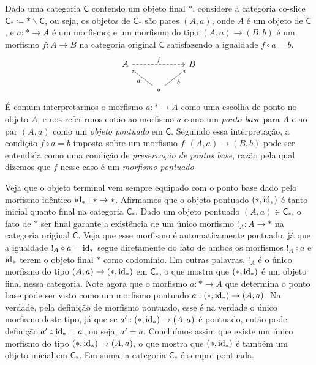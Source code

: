 \begin{exem}
  \label{exem:categoria_objetos_pontuados}
  Dada uma categoria $\mathsf{C}$ contendo um objeto final $*$, considere a categoria co-slice $\mathsf{C}_{*} \coloneqq * \backslash \mathsf{C}$, ou seja, os objetos de $\mathsf{C}_{*}$ são pares $(A,a)$, onde $A$ é um objeto de $\mathsf{C}$, e $a: * \to A$ é um morfismo; e um morfismo do tipo $(A,a) \to (B,b)$ é um morfismo $f: A \to B$ na categoria original $\mathsf{C}$ satisfazendo a igualdade $f \circ a = b$.
  \begin{displaymath}
    \begin{tikzcd}
      A
      \arrow[rr, dashed, "f"]
      & & B
      \\ & *
      \arrow[lu, "a"]
      \arrow[ru, "b" swap]
    \end{tikzcd}
  \end{displaymath}
  É comum interpretarmos o morfismo $a: * \to A$ como uma escolha de ponto no objeto $A$, e nos referirmos então ao morfismo $a$ como um \emph{ponto base} para $A$ e ao par $(A,a)$ como um \emph{objeto pontuado} em $\mathsf{C}$.
  Seguindo essa interpretação, a condição $f \circ a = b$ imposta sobre um morfismo $f: (A,a) \to (B,b)$ pode ser entendida como uma condição de \emph{preservação de pontos base}, razão pela qual dizemos que $f$ nesse caso é um \emph{morfismo pontuado}

  Veja que o objeto terminal vem sempre equipado com o ponto base dado pelo morfismo idêntico $\mathrm{id}_{*}: * \to *$.
  Afirmamos que o objeto pontuado $(*,\mathrm{id}_{*})$ é tanto inicial quanto final na categoria $\mathsf{C}_{*}$.
  Dado um objeto pontuado $(A,a) \in \mathsf{C}_{*}$, o fato de $*$ ser final garante a existência de um único morfismo $!_{A}: A \to *$ na categoria original $\mathsf{C}$.
  Veja que esse morfismo é automaticamente pontuado, já que a igualdade $!_{A} \circ a = \mathrm{id}_{*}$ segue diretamente do fato de ambos os morfismos $!_{A} \circ a$ e $\mathrm{id}_{*}$ terem o objeto final $*$ como codomínio.
  Em outras palavras, $!_{A}$ é o único morfismo do tipo $(A,a) \to (*,\mathrm{id}_{*})$ em $\mathsf{C}_{*}$, o que mostra que $(*,\mathrm{id}_{*})$ é um objeto final nessa categoria.
  Note agora que o morfismo $a: * \to A$ que determina o ponto base pode ser visto como um morfismo pontuado $a: (*,\mathrm{id}_{*}) \to (A,a)$.
  Na verdade, pela definição de morfismo pontuado, esse é na verdade o único morfismo deste tipo, já que se $a': (*,\mathrm{id}_{*}) \to (A,a)$ é pontuado, então pode definição $a' \circ \mathrm{id}_{*} = a$, ou seja, $a' = a$.
  Concluímos assim que existe um único morfismo do tipo $(*,\mathrm{id}_{*}) \to (A,a)$, o que mostra que $(*,\mathrm{id}_{*})$ é também um objeto inicial em $\mathsf{C}_{*}$.
  Em suma, a categoria $\mathsf{C}_{*}$ é sempre pontuada.
\end{exem}

